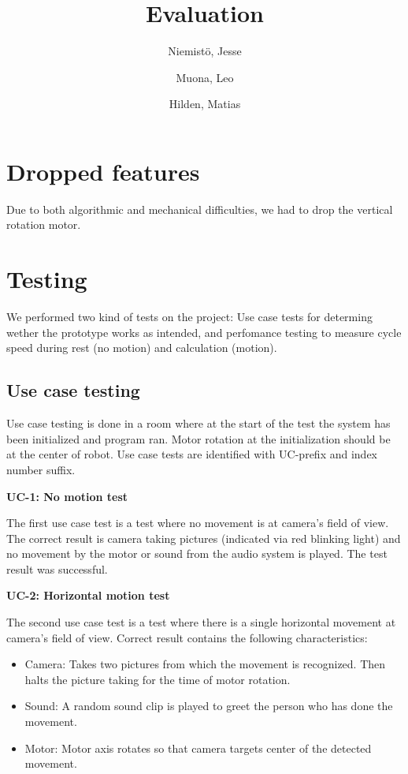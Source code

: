 \documentclass[english,11pt,twoside,a4paper]{article}
\begin{document}
\author{
  Niemistö, Jesse
  \and
  Muona, Leo
  \and
  Hilden, Matias
}
\title{Evaluation}

\maketitle

\section{Dropped features}

Due to both algorithmic and mechanical difficulties, we had to drop the vertical rotation motor.

\section{Testing}

We performed two kind of tests on the project: Use case tests for determing wether the prototype works as intended, and perfomance testing to measure cycle speed during rest (no motion) and calculation (motion).

\subsection{Use case testing}

Use case testing is done in a room where at the start of the test the system has been initialized and program ran. Motor rotation at the initialization should be at the center of robot. Use case tests are identified with UC-prefix and index number suffix.

\textbf{UC-1: No motion test}

The first use case test is a test where no movement is at camera's field of view. The correct result is camera taking pictures (indicated via red blinking light) and no movement by the motor or sound from the audio system is played. The test result was successful. 

\textbf{UC-2: Horizontal motion test}

The second use case test is a test where there is a single horizontal movement at camera's field of view. Correct result contains the following characteristics:

\begin{itemize}
  \item Camera: Takes two pictures from which the movement is recognized. Then halts the picture taking for the time of motor rotation.
  \item Sound: A random sound clip is played to greet the person who has done the movement.
  \item Motor: Motor axis rotates so that camera targets center of the detected movement.
\end{itemize}
\end{document}
